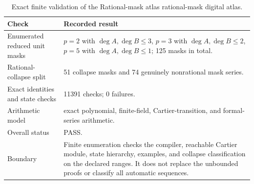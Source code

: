 \begin{table}[htbp]
\centering
\caption{Exact finite validation of the Rational-mask atlas rational-mask digital atlas.}
\label{tab:block04-validation}
\small
\begin{tabularx}{\textwidth}{@{}L{0.28\textwidth}Y@{}}
\toprule
Check & Recorded result\\
\midrule
Enumerated reduced unit masks & $p=2$ with $\deg A,\deg B\leq 3$, $p=3$ with $\deg A,\deg B\leq 2$, $p=5$ with $\deg A,\deg B\leq 1$; 125 masks in total.\\
Rational-collapse split & 51 collapse masks and 74 genuinely nonrational mask series.\\
Exact identities and state checks & 11391 checks; 0 failures.\\
Arithmetic model & exact polynomial, finite-field, Cartier-transition, and formal-series arithmetic.\\
Overall status & PASS.\\
Boundary & Finite enumeration checks the compiler, reachable Cartier module, state hierarchy, examples, and collapse classification on the declared ranges. It does not replace the unbounded proofs or classify all automatic sequences.\\
\bottomrule
\end{tabularx}
\end{table}
